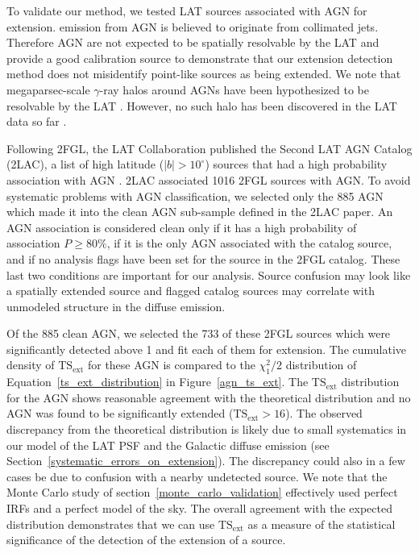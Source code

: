 \documentclass[12pt,preprint]{aastex}
\newcommand{\gev}{\text{GeV}\xspace}
\newcommand{\tsext}{{\ensuremath{\text{TS}_{\text{ext}}}}\xspace}
\newcommand{\degree}{^\circ\xspace}
\begin{document}
To validate our method, we tested LAT sources associated with AGN for
extension.  \gev emission from AGN is believed to originate from collimated jets.  Therefore AGN are
not expected to be spatially resolvable by the LAT and provide a good
calibration source to demonstrate that our extension detection method
does not misidentify point-like sources as being extended.  We note that
megaparsec-scale $\gamma$-ray halos around AGNs have been hypothesized
to be resolvable by the LAT \citep{pair_halo_paper}. However, no such
halo has been discovered in the LAT data so far \citep{neronov_agn_halo}.

Following 2FGL, the LAT Collaboration published the Second LAT AGN
Catalog (2LAC), a list of high latitude ($|b|>10\degree$) sources
that had a high probability association with AGN \citep{second_agn_cat}.
2LAC associated 1016 2FGL sources with AGN.  To avoid systematic problems
with AGN classification, we selected only the 885 AGN which made it into
the clean AGN sub-sample defined in the 2LAC paper.  An AGN association is considered clean only
if it has a high probability of association $P\ge 80\%$, if it is the
only AGN associated with the catalog source, and if 
no analysis flags have been set for the source
in the 2FGL catalog. These last two conditions are important for our
analysis. Source confusion may look like a spatially extended source
and flagged catalog sources may correlate with unmodeled structure in
the diffuse emission.

Of the 885 clean AGN, we selected the 733 of these 2FGL sources which
were significantly detected above 1 \gev and fit each of them for
extension.  The cumulative density of \tsext for these AGN is compared
to the $\chi^2_1/2$ distribution of Equation~\ref{ts_ext_distribution}
in Figure~\ref{agn_ts_ext}.  The \tsext distribution
for the AGN shows reasonable agreement with the theoretical
distribution and no AGN was found to be significantly extended
($\tsext>16$).  The observed discrepancy from the theoretical
distribution is likely due to small systematics
in our model of the LAT PSF and the Galactic diffuse emission (see
Section~\ref{systematic_errors_on_extension}).  
The discrepancy could
also in a few cases be due to confusion with a nearby undetected source.
We note that the Monte Carlo study
of section~\ref{monte_carlo_validation} effectively used perfect
IRFs and a perfect model of the sky.
The overall agreement with the expected distribution demonstrates that
we can use \tsext as a measure of the statistical significance of the
detection of the extension of a source.
\end{document}
